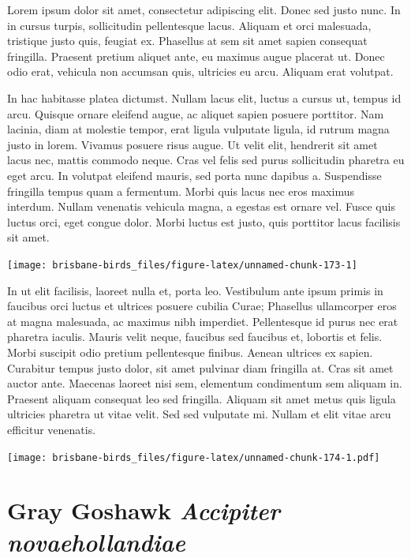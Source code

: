 \documentclass[]{book}
\let\origfigure\figure
\let\endorigfigure\endfigure
\renewenvironment{figure}[1][2] {
  \expandafter\origfigure\expandafter[H]
} {
  \endorigfigure
}
\begin{document}
Lorem ipsum dolor sit amet, consectetur adipiscing elit. Donec sed justo
nunc. In in cursus turpis, sollicitudin pellentesque lacus. Aliquam et
orci malesuada, tristique justo quis, feugiat ex. Phasellus at sem sit
amet sapien consequat fringilla. Praesent pretium aliquet ante, eu
maximus augue placerat ut. Donec odio erat, vehicula non accumsan quis,
ultricies eu arcu. Aliquam erat volutpat.

In hac habitasse platea dictumst. Nullam lacus elit, luctus a cursus ut,
tempus id arcu. Quisque ornare eleifend augue, ac aliquet sapien posuere
porttitor. Nam lacinia, diam at molestie tempor, erat ligula vulputate
ligula, id rutrum magna justo in lorem. Vivamus posuere risus augue. Ut
velit elit, hendrerit sit amet lacus nec, mattis commodo neque. Cras vel
felis sed purus sollicitudin pharetra eu eget arcu. In volutpat eleifend
mauris, sed porta nunc dapibus a. Suspendisse fringilla tempus quam a
fermentum. Morbi quis lacus nec eros maximus interdum. Nullam venenatis
vehicula magna, a egestas est ornare vel. Fusce quis luctus orci, eget
congue dolor. Morbi luctus est justo, quis porttitor lacus facilisis sit
amet.

\begin{figure}
\texttt{[image: brisbane-birds\_files/figure-latex/unnamed-chunk-173-1]} \caption{insert figure caption}\label{fig:unnamed-chunk-173}
\end{figure}

In ut elit facilisis, laoreet nulla et, porta leo. Vestibulum ante ipsum
primis in faucibus orci luctus et ultrices posuere cubilia Curae;
Phasellus ullamcorper eros at magna malesuada, ac maximus nibh
imperdiet. Pellentesque id purus nec erat pharetra iaculis. Mauris velit
neque, faucibus sed faucibus et, lobortis et felis. Morbi suscipit odio
pretium pellentesque finibus. Aenean ultrices ex sapien. Curabitur
tempus justo dolor, sit amet pulvinar diam fringilla at. Cras sit amet
auctor ante. Maecenas laoreet nisi sem, elementum condimentum sem
aliquam in. Praesent aliquam consequat leo sed fringilla. Aliquam sit
amet metus quis ligula ultricies pharetra ut vitae velit. Sed sed
vulputate mi. Nullam et elit vitae arcu efficitur venenatis.

\begin{figure}
\centering
\texttt{[image: brisbane-birds\_files/figure-latex/unnamed-chunk-174-1.pdf]}
\caption{\label{fig:unnamed-chunk-174}insert figure caption}
\end{figure}

\section{\texorpdfstring{Gray Goshawk \emph{Accipiter
novaehollandiae}}{Gray Goshawk Accipiter novaehollandiae}}\label{gray-goshawk-accipiter-novaehollandiae}
\end{document}
